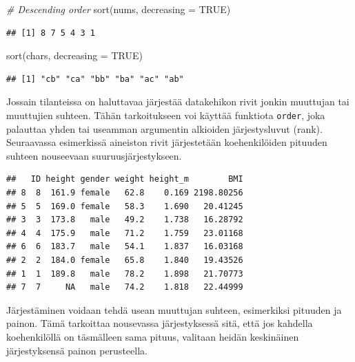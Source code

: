 \documentclass[
]{book}
\newenvironment{Shaded}{\begin{snugshade}}{\end{snugshade}}
\newcommand{\AttributeTok}[1]{\textcolor[rgb]{0.77,0.63,0.00}{#1}}
\newcommand{\CommentTok}[1]{\textcolor[rgb]{0.56,0.35,0.01}{\textit{#1}}}
\newcommand{\ConstantTok}[1]{\textcolor[rgb]{0.00,0.00,0.00}{#1}}
\newcommand{\FunctionTok}[1]{\textcolor[rgb]{0.00,0.00,0.00}{#1}}
\newcommand{\NormalTok}[1]{#1}
\newcommand{\SpecialCharTok}[1]{\textcolor[rgb]{0.00,0.00,0.00}{#1}}
\begin{document}
\begin{Shaded}
\begin{Highlighting}[]
\CommentTok{\# Descending order}
\FunctionTok{sort}\NormalTok{(nums, }\AttributeTok{decreasing =} \ConstantTok{TRUE}\NormalTok{)}
\end{Highlighting}
\end{Shaded}

\begin{verbatim}
## [1] 8 7 5 4 3 1
\end{verbatim}

\begin{Shaded}
\begin{Highlighting}[]
\FunctionTok{sort}\NormalTok{(chars, }\AttributeTok{decreasing =} \ConstantTok{TRUE}\NormalTok{)}
\end{Highlighting}
\end{Shaded}

\begin{verbatim}
## [1] "cb" "ca" "bb" "ba" "ac" "ab"
\end{verbatim}

Jossain tilanteissa on haluttavaa järjestää datakehikon rivit jonkin muuttujan tai muuttujien suhteen. Tähän tarkoitukseen voi käyttää funktiota \texttt{order}, joka palauttaa yhden tai useamman argumentin alkioiden järjestysluvut (rank). Seuraavassa esimerkissä aineiston rivit järjestetään koehenkilöiden pituuden suhteen nouseevaan suuruusjärjestykseen.

\begin{Shaded}
\end{Shaded}

\begin{verbatim}
##   ID height gender weight height_m        BMI
## 8  8  161.9 female   62.8    0.169 2198.80256
## 5  5  169.0 female   58.3    1.690   20.41245
## 3  3  173.8   male   49.2    1.738   16.28792
## 4  4  175.9   male   71.2    1.759   23.01168
## 6  6  183.7   male   54.1    1.837   16.03168
## 2  2  184.0 female   65.8    1.840   19.43526
## 1  1  189.8   male   78.2    1.898   21.70773
## 7  7     NA   male   74.2    1.818   22.44999
\end{verbatim}

Järjestäminen voidaan tehdä usean muuttujan suhteen, esimerkiksi pituuden ja painon. Tämä tarkoittaa nousevassa järjestyksessä sitä, että jos kahdella koehenkilöllä on täsmälleen sama pituus, valitaan heidän keskinäinen järjestyksensä painon perusteella.
\end{document}
